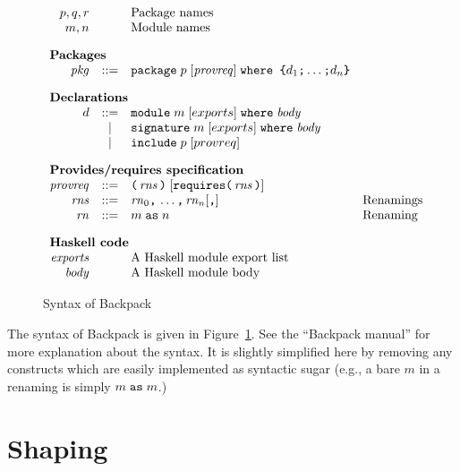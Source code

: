 \documentclass{article}
\newcommand{\I}[1]{\ensuremath{\mathit{#1}}}
\begin{document}
\begin{figure}[htpb]
$$
\begin{array}{rcll}
p,q,r && \mbox{Package names} \\
m,n   && \mbox{Module names} \\[1em]
\multicolumn{3}{l}{\mbox{\bf Packages}} \\
  \I{pkg} & ::= & \verb|package|\; p\; [\I{provreq}]\; \verb|where {| d_1 \verb|;| \ldots \verb|;| d_n \verb|}| \\[1em]
\multicolumn{3}{l}{\mbox{\bf Declarations}} \\
  d & ::= & \verb|module|\;    m \; [exports]\; \verb|where|\; \I{body} \\
    & |   & \verb|signature|\; m \; [exports]\; \verb|where|\; \I{body} \\
    & |   & \verb|include|\; p \; [provreq] \\[1em]
\multicolumn{3}{l}{\mbox{\bf Provides/requires specification}} \\
\I{provreq} & ::= & \verb|(| \, \I{rns} \, \verb|)| \; 
        [ \verb|requires(|\, \I{rns} \, \verb|)| ] \\
\I{rns} & ::= & \I{rn}_0 \verb|,| \, \ldots \verb|,| \, \I{rn}_n [\verb|,|] & \mbox{Renamings} \\
\I{rn} & ::= & m\; \verb|as| \; n & \mbox{Renaming} \\[1em] 
\multicolumn{3}{l}{\mbox{\bf Haskell code}} \\
\I{exports} & & \mbox{A Haskell module export list} \\
\I{body}    & & \mbox{A Haskell module body} \\
\end{array}
$$
\caption{Syntax of Backpack} \label{fig:syntax}
\end{figure}

The syntax of Backpack is given in Figure~\ref{fig:syntax}.
See the ``Backpack manual'' for more explanation about the syntax.  It
is slightly simplified here by removing any constructs which are easily implemented as
syntactic sugar (e.g., a bare $m$ in a renaming is simply $m\; \verb|as|\; m$.)

\newpage
\section{Shaping}
\end{document}
